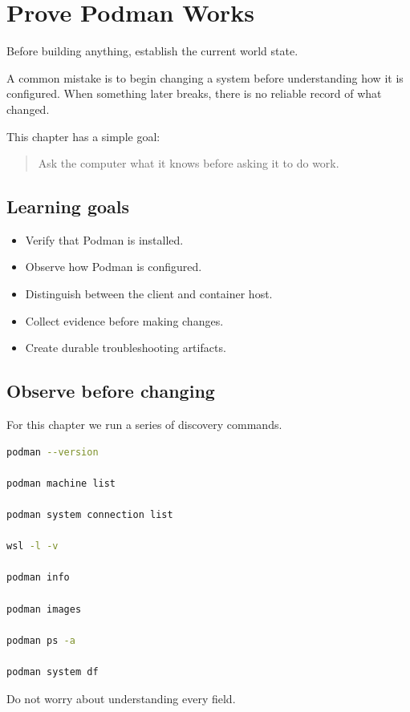 \chapter{Prove Podman Works}
\label{chap:prove-podman-works}

Before building anything, establish the current world state.

A common mistake is to begin changing a system before understanding how it is configured. When something later breaks, there is no reliable record of what changed.

This chapter has a simple goal:

\begin{quote}
Ask the computer what it knows before asking it to do work.
\end{quote}

\section{Learning goals}

\begin{itemize}
  \item Verify that Podman is installed.
  \item Observe how Podman is configured.
  \item Distinguish between the client and container host.
  \item Collect evidence before making changes.
  \item Create durable troubleshooting artifacts.
\end{itemize}

\section{Observe before changing}

For this chapter we run a series of discovery commands.

\begin{lstlisting}[language=bash]
podman --version

podman machine list

podman system connection list

wsl -l -v

podman info

podman images

podman ps -a

podman system df
\end{lstlisting}

Do not worry about understanding every field.

